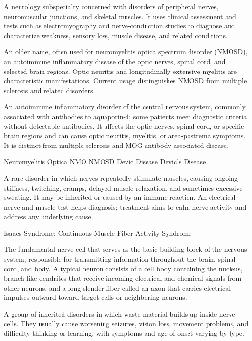  A neurology subspecialty concerned with disorders of peripheral nerves,
neuromuscular junctions, and skeletal muscles. It uses clinical assessment and tests such
as electromyography and nerve-conduction studies to diagnose and characterize weakness,
sensory loss, muscle disease, and related conditions.

 An older name, often used for neuromyelitis optica spectrum disorder (NMOSD), an autoimmune inflammatory disease of the optic nerves, spinal cord, and selected brain regions. Optic neuritis and longitudinally extensive myelitis are characteristic manifestations. Current usage distinguishes NMOSD from multiple sclerosis and related disorders.

 An autoimmune inflammatory disorder of the central nervous system, commonly associated with antibodies to aquaporin-4; some patients meet diagnostic criteria without detectable antibodies. It affects the optic nerves, spinal cord, or specific brain regions and can cause optic neuritis, myelitis, or area-postrema symptoms. It is distinct from multiple sclerosis and MOG-antibody-associated disease.

\synonyms
Neuromyelitis Optica
NMO
NMOSD
Devic Disease
Devic's Disease

 A rare disorder in which nerves repeatedly stimulate muscles, causing ongoing stiffness, twitching, cramps, delayed muscle relaxation, and sometimes excessive sweating. It may be inherited or caused by an immune reaction. An electrical nerve and muscle test helps diagnosis; treatment aims to calm nerve activity and address any underlying cause.

\synonyms
Isaacs Syndrome; Continuous Muscle Fiber Activity Syndrome

 The fundamental nerve cell that serves as the basic building block of the nervous system, responsible for transmitting information throughout the brain, spinal cord, and body. A typical neuron consists of a cell body containing the nucleus, branch-like dendrites that receive incoming electrical and chemical signals from other neurons, and a long slender fiber called an axon that carries electrical impulses outward toward target cells or neighboring neurons.

 A group of inherited disorders in which waste material builds up inside nerve cells. They usually cause worsening seizures, vision loss, movement problems, and difficulty thinking or learning, with symptoms and age of onset varying by type.


